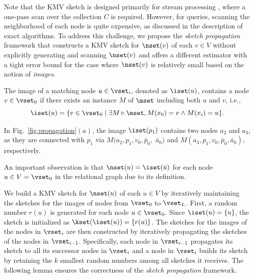 Note that the KMV sketch is designed primarily for stream processing \cite{estan2003bitmap, alon1996space, durand2003loglog, heule2013hyperloglog, gibbons2001distinct}, where a one-pass scan over the collection $C$ is required.
However, for \ced queries, scanning the neighborhood of each node is quite expensive, as discussed in the description of exact algorithms.
To address this challenge, we propose the \emph{sketch propagation} framework that constructs a KMV sketch for $\nset(v)$ of each $v \in V$ without explicitly generating and scanning $\nset(v)$ and offers a different estimator with a tight error bound for the case where $\nset(v)$ is relatively small based on the notion of \emph{images}.
\begin{definition}[Images]
  The image of a matching node $u \in \vset_i$, denoted as $\iset(u)$, contains a node $v \in \vset_0$ if there exists an instance $M$ of $\mset$ including both $u$ and $v$, i.e., 
  $$\iset(u) = \{ v \in \vset_0 \mid \exists M \triangleright \mset, M(x_0) = v \wedge M(x_i) = u \}.$$
\end{definition}
\begin{example}
  In Fig.~\ref{fig:propagation}$(a)$, the image $\iset(p_1)$ contains two nodes $a_2$ and $a_3$, as they are connected with $p_1$ via $M(a_2, p_1, v_0, \bar{p}_0,$ $\bar{a}_0)$ and $M(a_3, p_1, v_0, \bar{p}_0, \bar{a}_0)$, respectively.
\end{example}
An important observation is that $\nset(u) = \iset(\bar{u})$ for each node $u \in V=\vset_0$ in the relational graph due to its definition.

\vspace{1mm}
We build a KMV sketch for $\nset(u)$ of each $u \in V$ by iteratively maintaining the sketches for the images of nodes from $\vset_0$ to $\vset_L$.
First, a random number $r(u)$ is generated for each node $u \in \vset_0$. Since $\iset(u) = \{u\}$, the sketch is initialized as $\kset(\iset(u))=\{r(u)\}$. 
The sketches for the images of the nodes in $\vset_i$ are then constructed by iteratively propagating the sketches of the nodes in $\vset_{i-1}$.
Specifically, each node in $\vset_{i-1}$ propagates its sketch to all its successor nodes in $\vset_{i}$ and a node in $\vset_i$ builds its sketch by retaining the $k$ smallest random numbers among all sketches it receives.
The following lemma ensures the correctness of the \emph{sketch propagation} framework.

